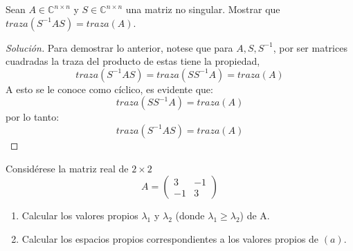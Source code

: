 \documentclass[12pt]{book}
\newcommand{\C}{\mathbb{C}}
\newenvironment{solucion}
  {\renewcommand\qedsymbol{$\square$}\begin{proof}[Solución]}
  {\end{proof}}
\begin{document}
\eje Sean $A\in\C^{n\times n}$ y $S\in\C^{n\times n}$ una matriz no singular. Mostrar que $traza(S^{-1}AS)=traza(A)$.
\begin{solucion}
Para demostrar lo anterior, notese que para $A, S, S^{-1}$, por ser matrices cuadradas la traza del producto de estas tiene la propiedad, 
    \[
        traza(S^{-1}AS)=traza(SS^{-1}A)=traza(A)
    \]
A esto se le conoce como cíclico, es evidente que:
    \[
        traza(SS^{-1}A)=traza(A)
    \]
por lo tanto:
    \[
        traza(S^{-1}AS)=traza(A)
    \]
\end{solucion}

\eje Considérese la matriz real de $2\times2$
\[A=\begin{pmatrix}
3&-1\\
-1&3
\end{pmatrix}\]
\renewcommand{\labelenumi}{(\alph{enumi})}
\begin{enumerate}
    \item Calcular los valores propios $\lambda_1$ y $\lambda_2$ (donde $\lambda_1\geq\lambda_2$) de A.
    \item Calcular los espacios propios correspondientes a los valores propios de $(a)$.
\end{enumerate}
\end{document}
